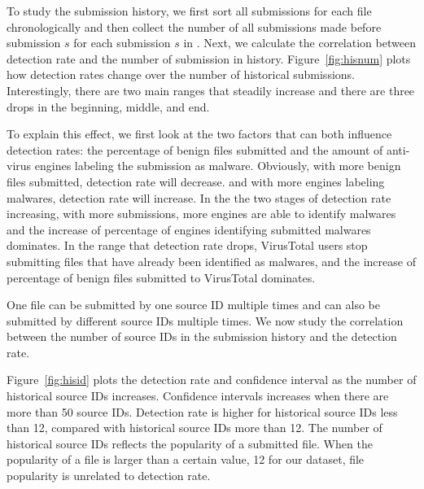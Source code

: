 To study the submission history, we first sort all submissions for each file chronologically
and then collect the number of all submissions made before submission $s$ for each submission $s$ in \vt.
Next, we calculate the correlation between detection rate and the number of submission in history.
Figure~\ref{fig:hisnum} plots how detection rates change over the number of historical submissions.
Interestingly, there are two main ranges that steadily increase and there are three drops in the beginning, middle, and end.

To explain this effect, we first look at the two factors that can both influence detection rates:
the percentage of benign files submitted and the amount of anti-virus engines labeling the submission as malware.
Obviously, with more benign files submitted, detection rate will decrease.   
and with more engines labeling malwares, detection rate will increase. 
In the the two stages of detection rate increasing, 
with more submissions, more engines are able to identify malwares 
and the increase of percentage of engines identifying submitted malwares dominates. 
In the range that detection rate drops, 
VirusTotal users stop submitting files that have already been identified as malwares,
and the increase of percentage of benign files submitted to VirusTotal dominates. 

One file can be submitted by one source ID multiple times 
and can also be submitted by different source IDs multiple times. 
We now study the correlation between the number of source IDs in the submission history and the detection rate. 

Figure~\ref{fig:hisid} plots the detection rate and confidence interval as the number of historical source IDs increases. 
Confidence intervals increases when there are more than 50 source IDs. 
Detection rate is higher for historical source IDs less than 12, compared with historical source IDs more than 12.
The number of historical source IDs reflects the popularity of a submitted file.
When the popularity of a file is larger than a certain value, 12 for our dataset, 
file popularity is unrelated to detection rate. 

